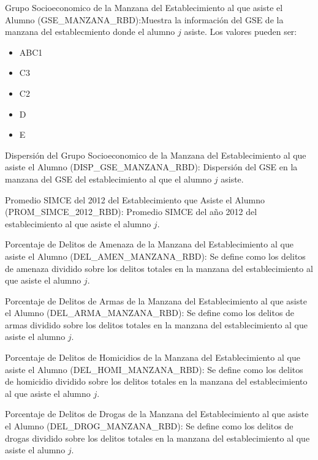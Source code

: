 \begin{longdescription}
\begin{longdescription}
        \item[Grupo Socioeconomico de la Manzana del Establecimiento al que asiste el Alumno](GSE\_MANZANA\_RBD):Muestra la información del GSE de la manzana del establecmiento donde el alumno $j$ asiste.
        Los valores pueden ser:
        \begin{itemize}
        \item ABC1
        \item C3
        \item C2
        \item D
        \item E
        \end{itemize}
        
        \item[Dispersión del Grupo Socioeconomico de la Manzana del Establecimiento al que asiste el Alumno](DISP\_GSE\_MANZANA\_RBD):
        Dispersión del GSE en la manzana del GSE del establecimiento al que el alumno $j$ asiste.
        
        \item[Promedio SIMCE del 2012 del Establecimiento que Asiste el Alumno](PROM\_SIMCE\_2012\_RBD):
        Promedio SIMCE del año 2012 del establecimiento al que asiste el alumno $j$.
        
        \item[Porcentaje de Delitos de Amenaza de la Manzana del Establecimiento al que asiste el Alumno](DEL\_AMEN\_MANZANA\_RBD): Se define como los delitos de amenaza dividido sobre los delitos totales en la manzana del establecimiento al que asiste el alumno $j$.
        
        \item[Porcentaje de Delitos de Armas de la Manzana del Establecimiento al que asiste el Alumno](DEL\_ARMA\_MANZANA\_RBD): Se define como los delitos de armas dividido sobre los delitos totales en la manzana del establecimiento al que asiste el alumno $j$.
        
        \item[Porcentaje de Delitos de Homicidios de la Manzana del Establecimiento al que asiste el Alumno](DEL\_HOMI\_MANZANA\_RBD): Se define como los delitos de homicidio dividido sobre los delitos totales en la manzana del establecimiento al que asiste el alumno $j$.
        
        \item[Porcentaje de Delitos de Drogas de la Manzana del Establecimiento al que asiste el Alumno](DEL\_DROG\_MANZANA\_RBD):
        Se define como los delitos de drogas dividido sobre los delitos totales en la manzana del establecimiento al que asiste el alumno $j$.
        

\end{longdescription}
\end{longdescription}
